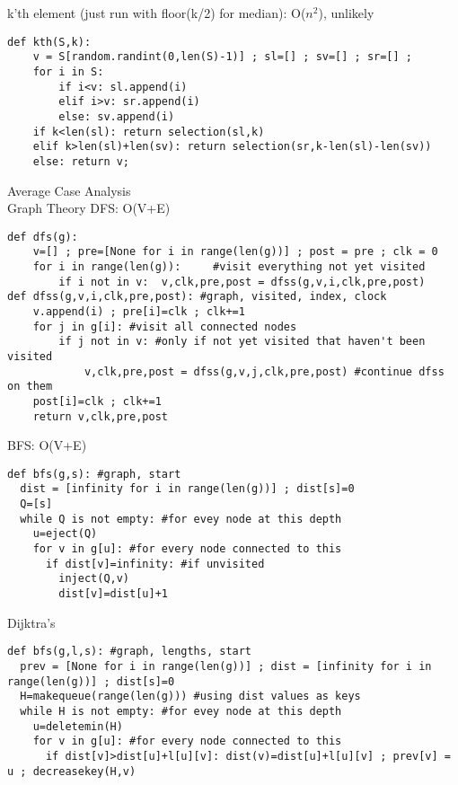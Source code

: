 \documentclass{article}
\begin{document}
k'th element (just run with floor(k/2) for median): O($n^2$), unlikely
\begin{verbatim}
def kth(S,k):
    v = S[random.randint(0,len(S)-1)] ; sl=[] ; sv=[] ; sr=[] ;
    for i in S:
        if i<v: sl.append(i)
        elif i>v: sr.append(i)
        else: sv.append(i)
    if k<len(sl): return selection(sl,k)
    elif k>len(sl)+len(sv): return selection(sr,k-len(sl)-len(sv))
    else: return v;
\end{verbatim}
\indent Average Case Analysis
\\\indent Graph Theory
DFS: O(V+E)
\begin{verbatim}
def dfs(g):
    v=[] ; pre=[None for i in range(len(g))] ; post = pre ; clk = 0
    for i in range(len(g)):     #visit everything not yet visited
        if i not in v:  v,clk,pre,post = dfss(g,v,i,clk,pre,post)
def dfss(g,v,i,clk,pre,post): #graph, visited, index, clock
    v.append(i) ; pre[i]=clk ; clk+=1
    for j in g[i]: #visit all connected nodes
        if j not in v: #only if not yet visited that haven't been visited
            v,clk,pre,post = dfss(g,v,j,clk,pre,post) #continue dfss on them
    post[i]=clk ; clk+=1
    return v,clk,pre,post
\end{verbatim}
BFS: O(V+E)
\begin{verbatim}
def bfs(g,s): #graph, start
  dist = [infinity for i in range(len(g))] ; dist[s]=0
  Q=[s]
  while Q is not empty: #for evey node at this depth
    u=eject(Q)
    for v in g[u]: #for every node connected to this
      if dist[v]=infinity: #if unvisited
        inject(Q,v)
        dist[v]=dist[u]+1
\end{verbatim}
Dijktra's
\begin{verbatim}
def bfs(g,l,s): #graph, lengths, start
  prev = [None for i in range(len(g))] ; dist = [infinity for i in range(len(g))] ; dist[s]=0
  H=makequeue(range(len(g))) #using dist values as keys
  while H is not empty: #for evey node at this depth
    u=deletemin(H)
    for v in g[u]: #for every node connected to this
      if dist[v]>dist[u]+l[u][v]: dist(v)=dist[u]+l[u][v] ; prev[v] = u ; decreasekey(H,v)
\end{verbatim}
\end{document}
